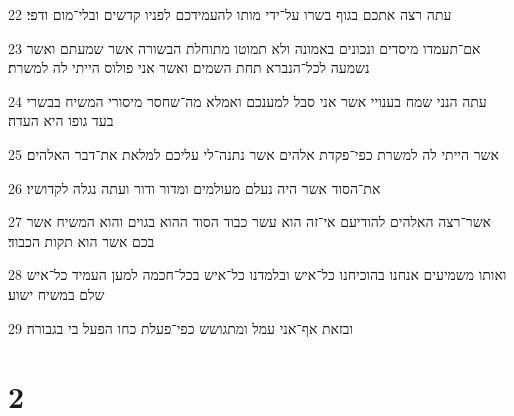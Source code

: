 \par 22 עתה רצה אתכם בגוף בשרו על־ידי מותו להעמידכם לפניו קדשים ובלי־מום ודפי׃
\par 23 אם־תעמדו מיסדים ונכונים באמונה ולא תמוטו מתוחלת הבשורה אשר שמעתם ואשר נשמעה לכל־הנברא תחת השמים ואשר אני פולוס הייתי לה למשרת׃
\par 24 עתה הנני שמח בענויי אשר אני סבל למענכם ואמלא מה־שחסר מיסורי המשיח בבשרי בעד גופו היא העדה׃
\par 25 אשר הייתי לה למשרת כפי־פקדת אלהים אשר נתנה־לי עליכם למלאת את־דבר האלהים׃
\par 26 את־הסוד אשר היה נעלם מעולמים ומדור ודור ועתה נגלה לקדושיו׃
\par 27 אשר־רצה האלהים להודיעם אי־זה הוא עשר כבוד הסוד ההוא בגוים והוא המשיח אשר בכם אשר הוא תקות הכבוד׃
\par 28 ואותו משמיעים אנחנו בהוכיחנו כל־איש ובלמדנו כל־איש בכל־חכמה למען העמיד כל־איש שלם במשיח ישוע׃
\par 29 ובזאת אף־אני עמל ומתגושש כפי־פעלת כחו הפעל בי בגבורה׃

\chapter{2}

